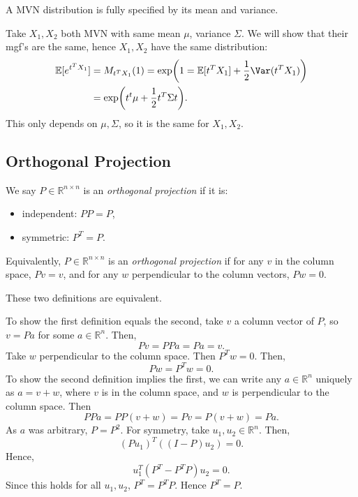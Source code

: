 \documentclass[12pt]{article}
\begin{document}
\begin{proposition}
	A MVN distribution is fully specified by its mean and variance.
\end{proposition}

\begin{proofbox}
	Take $X_1, X_2$ both MVN with same mean $\mu$, variance $\Sigma$. We will show that their mgf's are the same, hence $X_1, X_2$ have the same distribution:
	\begin{align*}
		\mathbb{E}[e^{t^{T}X_1}] &= M_{t^{T}X_1}(1) = \exp \biggl( 1 = \mathbb{E}[t^{T}X_1] + \frac{1}{2} \Var(t^{T}X_1)\biggr) \\
					 &= \exp\biggl(t^{t}\mu + \frac{1}{2} t^{T}\Sigma t\biggr).
	\end{align*}
	This only depends on $\mu, \Sigma$, so it is the same for $X_1, X_2$.
\end{proofbox}

\subsection{Orthogonal Projection}
\label{sub:orthogonal_projection}

\begin{definition}
	We say $P \in \mathbb{R}^{n \times n}$ is an \emph{orthogonal projection}  if it is:
	\begin{itemize}
		\item independent: $PP = P$,
		\item symmetric: $P^{T} = P$.
	\end{itemize}
	Equivalently, $P \in \mathbb{R}^{n \times n}$ is an \emph{orthogonal projection} if for any $v$ in the column space, $Pv = v$, and for any $w$ perpendicular to the column vectors, $Pw = 0$.
\end{definition}

\begin{proposition}
	These two definitions are equivalent.
\end{proposition}

\begin{proofbox}
	To show the first definition equals the second, take $v$ a column vector of $P$, so $v = Pa$ for some $a \in \mathbb{R}^{n}$. Then,
	\[
	Pv = PPa = Pa = v.
	\]
	Take $w$ perpendicular to the column space. Then $P^{T}w = 0$. Then,
	\[
	Pw = P^{T}w = 0.
	\]
	To show the second definition implies the first, we can write any $a \in \mathbb{R}^{n}$ uniquely as $a = v + w$, where $v$ is in the column space, and $w$ is perpendicular to the column space. Then
	\[
	PPa = PP(v+w) = Pv = P(v+w) = Pa.
	\]
	As $a$ was arbitrary, $P = P^2$. For symmetry, take $u_1, u_2 \in \mathbb{R}^{n}$. Then,
	\[
		(Pu_1)^{T}((I-P)u_2) = 0.
	\]
	Hence,
	\[
	u_1^{T}(P^{T} - P^{T}P)u_2 = 0.
	\]
	Since this holds for all $u_1, u_2$, $P^{T} = P^{T}P$. Hence $P^{T} = P$.
\end{proofbox}
\end{document}
